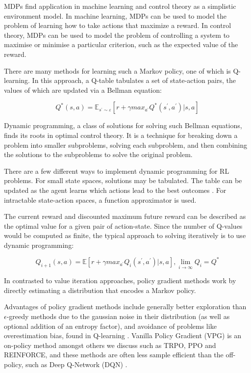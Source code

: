 \documentclass{article}
\begin{document}
MDPs find application in machine learning and control theory as a simplistic environment model. In machine learning, MDPs can be used to model the problem of learning how to take actions that maximize a reward. In control theory, MDPs can be used to model the problem of controlling a system to maximise or minimise a particular criterion, such as the expected value of the reward.

There are many methods for learning such a Markov policy, one of which is Q-learning. In this approach, a Q-table tabulates a set of state-action pairs, the values of which are updated via a Bellman equation:

\begin{equation} \label{Bellman Equation}
  Q^{\ast}(s,a)=\mathbb{E}_{s^{'}\sim\varepsilon}[r+\gamma{max_{a^{'}}Q^{*}(s^{'},a^{'})}|s,a]
\end{equation}

Dynamic programming, a class of solutions for solving such Bellman equations, finds its roots in optimal control theory. It is a technique for breaking down a problem into smaller subproblems, solving each subproblem, and then combining the solutions to the subproblems to solve the original problem.

There are a few different ways to implement dynamic programming for RL problems. For small state spaces, solutions may be tabulated. The table can be updated as the agent learns which actions lead to the best outcomes \citep{lewis2009reinforcement}. For intractable state-action spaces, a function approximator is used. 

The current reward and discounted maximum future reward can be described as the optimal value for a given pair of action-state. Since the number of Q-values would be computed as finite, the typical approach to solving iteratively is to use dynamic programming:

\begin{equation}
  Q_{i+1}(s,a)=\mathbb{E}[r+\gamma{max_{a^{'}}Q_{i}(s^{'},a^{'})}|s,a],{}\lim_{i\rightarrow{\infty}}Q_{i}=Q^{\ast}
\end{equation}

In contrasted to value iteration approaches, policy gradient methods work by directly estimating a distribution that encodes a Markov policy. 

Advantages of policy gradient methods include generally better exploration than $\epsilon$-greedy methods due to the gaussian noise in their distribution (as well as optional addition of an entropy factor), and avoidance of problems like overestimation bias, found in Q-learning \citep{hasselt2010double}. 
Vanilla Policy Gradient (VPG) is an on-policy method \citep{peters2006policy} amongst others we discuss such as TRPO, PPO and REINFORCE, and these methods are often less sample efficient than the off-policy, such as Deep Q-Network (DQN) \citep{dqn}.
\end{document}
